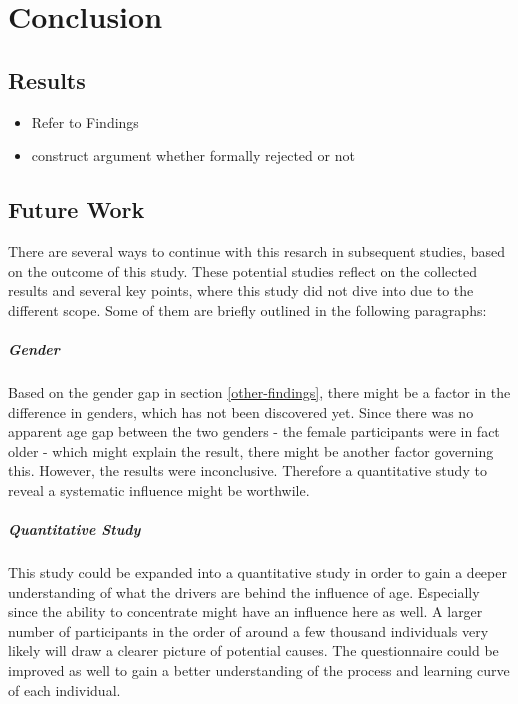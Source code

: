     \chapter{Conclusion}

        \section{Results}

            \begin{itemize}
                \item Refer to Findings
                \item construct argument whether formally rejected or not
            \end{itemize}

        \section{Future Work}

            There are several ways to continue with this resarch in subsequent studies, based on the outcome of this study. These potential studies reflect on the collected results and several key points, where this study did not dive into due to the different scope. Some of them are briefly outlined in the following paragraphs:

            \paragraph{Gender} Based on the gender gap in section \ref*{other-findings}, there might be a factor in the difference in genders, which has not been discovered yet. Since there was no apparent age gap between the two genders - the female participants were in fact older - which might explain the result, there might be another factor governing this. However, the results were inconclusive. Therefore a quantitative study to reveal a systematic influence might be worthwile. 

            \paragraph{Quantitative Study} This study could be expanded into a quantitative study in order to gain a deeper understanding of what the drivers are behind the influence of age. Especially since the ability to concentrate might have an influence here as well. A larger number of participants in the order of around a few thousand individuals very likely will draw a clearer picture of potential causes. The questionnaire could be improved as well to gain a better understanding of the process and learning curve of each individual. 


